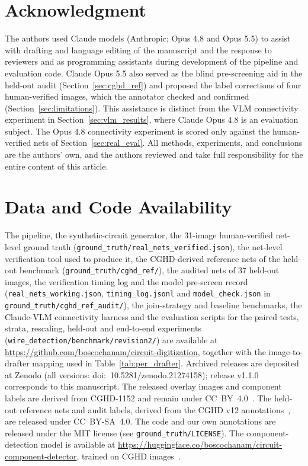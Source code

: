 \documentclass[journal]{IEEEtran}
\begin{document}
\section*{Acknowledgment}
The authors used Claude models (Anthropic; Opus 4.8 and Opus 5.5) to assist with drafting and language editing of the manuscript and the response to reviewers and as programming assistants during development of the pipeline and evaluation code. Claude Opus 5.5 also served as the blind pre-screening aid in the held-out audit (Section~\ref{sec:cghd_ref}) and proposed the label corrections of four human-verified images, which the annotator checked and confirmed (Section~\ref{sec:limitations}). This assistance is distinct from the VLM connectivity experiment in Section~\ref{sec:vlm_results}, where Claude Opus 4.8 is an evaluation subject. The Opus 4.8 connectivity experiment is scored only against the human-verified nets of Section~\ref{sec:real_eval}. All methods, experiments, and conclusions are the authors' own, and the authors reviewed and take full responsibility for the entire content of this article.

\section*{Data and Code Availability}
The pipeline, the synthetic-circuit generator, the 31-image human-verified net-level ground truth (\texttt{ground\_truth/real\_nets\_verified.json}), the net-level verification tool used to produce it, the CGHD-derived reference nets of the held-out benchmark (\texttt{ground\_truth/cghd\_ref/}), the audited nets of 37 held-out images, the verification timing log and the model pre-screen record (\texttt{real\_nets\_working.json}, \texttt{timing\_log.jsonl} and \texttt{model\_check.json} in \texttt{ground\_truth/cghd\_ref\_audit/}), the join-strategy and baseline benchmarks, the Claude-VLM connectivity harness and the evaluation scripts for the paired tests, strata, rescaling, held-out and end-to-end experiments (\texttt{wire\_detection/benchmark/revision2/}) are available at \url{https://github.com/boscochanam/circuit-digitization}, together with the image-to-drafter mapping used in Table~\ref{tab:per_drafter}. Archived releases are deposited at Zenodo (all versions: doi:~10.5281/zenodo.21274158); release v1.1.0 corresponds to this manuscript. The released overlay images and component labels are derived from CGHD-1152 and remain under CC~BY~4.0~\cite{cghd1152data}. The held-out reference nets and audit labels, derived from the CGHD v12 annotations~\cite{cghdv12data}, are released under CC~BY-SA~4.0. The code and our own annotations are released under the MIT license (see \texttt{ground\_truth/LICENSE}). The component-detection model is available at \url{https://huggingface.co/boscochanam/circuit-component-detector}, trained on CGHD images~\cite{bayer2021cghd,cghd1152data}.
\end{document}
